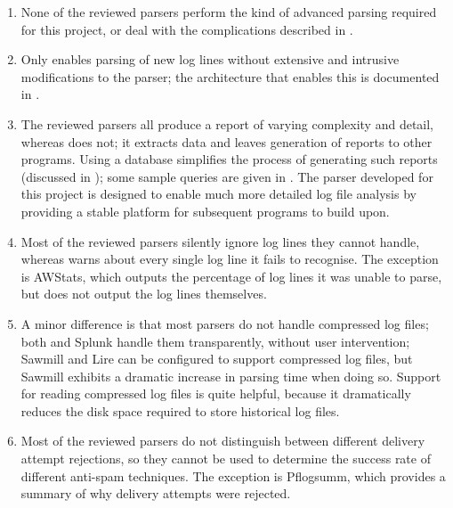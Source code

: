 \begin{enumerate}

    \item None of the reviewed parsers perform the kind of advanced parsing
        required for this project, or deal with the complications described
        in .

    \item Only \parsername{} enables parsing of new log lines without
        extensive and intrusive modifications to the parser; the
        architecture that enables this is documented in .

    \item The reviewed parsers all produce a report of varying complexity
        and detail, whereas \parsername{} does not; it extracts data and
        leaves generation of reports to other programs.  Using a
         database simplifies the process of generating such
        reports (discussed in ); some sample
        queries are given in .  The parser developed
        for this project is designed to enable much more detailed log file
        analysis by providing a stable platform for subsequent programs to
        build upon.

    \item Most of the reviewed parsers silently ignore log lines they
        cannot handle, whereas \parsername{} warns about every single log
        line it fails to recognise.  The exception is AWStats, which
        outputs the percentage of log lines it was unable to parse, but
        does not output the log lines themselves.

    \item A minor difference is that most parsers do not handle compressed
        log files; both \parsername{} and Splunk handle them transparently,
        without user intervention; Sawmill and Lire can be configured to
        support compressed log files, but Sawmill exhibits a dramatic
        increase in parsing time when doing so.  Support for reading
        compressed log files is quite helpful, because it dramatically
        reduces the disk space required to store historical log files.

    \item Most of the reviewed parsers do not distinguish between different
        delivery attempt rejections, so they cannot be used to determine
        the success rate of different anti-spam techniques.  The exception
        is Pflogsumm, which provides a summary of why delivery attempts
        were rejected.

\end{enumerate}


